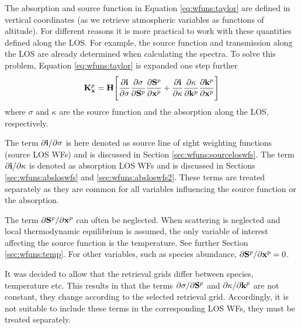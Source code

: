   The absorption and source function in Equation \ref{eq:wfuns:taylor}
  are defined in vertical coordinates (as we retrieve atmospheric
  variables as functions of altitude). For different reasons it is
  more practical to work with these quantities defined along the LOS.
  For example, the source function and transmission along the LOS are
  already determined when calculating the spectra. To solve this
  problem, Equation \ref{eq:wfuns:taylor} is expanded one step further
  \begin{equation}
    \mathbf{K}_{\mathbf{x}}^p = \mathbf{H} \Bigg[ \frac{\partial\mathbf{i}}{\partial \sigma}
                 \frac{\partial \sigma}{\partial \mathbf{S}^p} 
                 \frac{\partial \mathbf{S}^p}{\partial \mathbf{x}^p} +
                 \frac{\partial\mathbf{i}}{\partial \kappa}
                 \frac{\partial \kappa}{\partial \mathbf{k}^p}
                 \frac{\partial \mathbf{k}^p}{\partial \mathbf{x}^p} \Bigg]
   \label{eq:wfuns:taylor2}
  \end{equation}
  where $\sigma$ and $\kappa$ are the source function and the absorption 
  along the LOS, respectively.
  
  The term $\partial\mathbf{i} / \partial \sigma$ is here denoted as source
  line of sight weighting functions (source LOS WFs) and is discussed
  in Section \ref{sec:wfuns:sourceloswfs}. The term $\partial\mathbf{i}/
  \partial \kappa$ is denoted as absorption LOS WFs and is discussed
  in Sections \ref{sec:wfuns:absloswfs} and
  \ref{sec:wfuns:absloswfs2}. These terms are treated separately as
  they are common for all variables influencing the source function or
  the absorption.

  The term $\partial \mathbf{S}^p/\partial \mathbf{x}^p$ can often be neglected.
  When scattering is neglected and local thermodynamic equilibrium is
  assumed, the only variable of interest affecting the source function
  is the temperature.  See further Section \ref{sec:wfuns:temp}. For
  other variables, such as species abundance, $\partial
  \mathbf{S}^p/\partial \mathbf{x}^p=0$.
  
  It was decided to allow that the retrieval grids differ between
  species, temperature etc. This results in that the terms $\partial
  \sigma/ \partial \mathbf{S}^p$ and $\partial \kappa/ \partial
  \mathbf{k}^p$ are not constant, they change according to the selected
  retrieval grid. Accordingly, it is not suitable to include these terms
  in the corresponding LOS WFs, they must be treated separately.
  
  

 \label{sec:wfuns:absloswfs}

